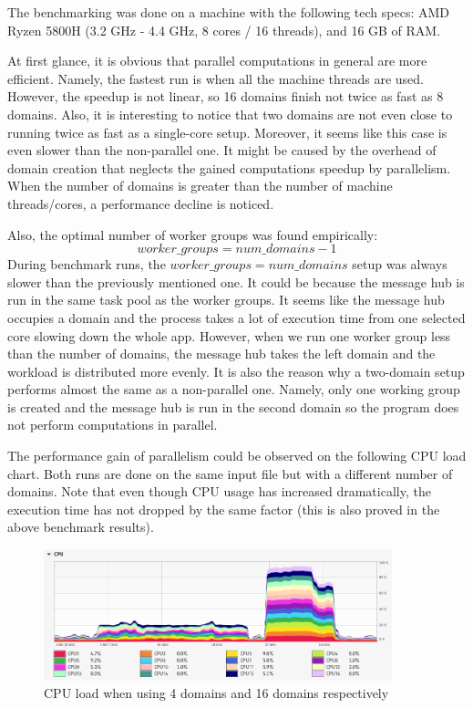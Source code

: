 \documentclass{article}
\begin{document}
The benchmarking was done on a machine with the following tech specs: AMD Ryzen 5800H (3.2 GHz - 4.4 GHz, 8 cores / 16 threads), and 16 GB of RAM. 

At first glance, it is obvious that parallel computations in general are more efficient. Namely, the fastest run is when all the machine threads are used. However, the speedup is not linear, so 16 domains finish not twice as fast as 8 domains. Also, it is interesting to notice that two domains are not even close to running twice as fast as a single-core setup. Moreover, it seems like this case is even slower than the non-parallel one. It might be caused by the overhead of domain creation that neglects the gained computations speedup by parallelism. When the number of domains is greater than the number of machine threads/cores, a performance decline is noticed.

Also, the optimal number of worker groups was found empirically: 
$$ worker\_groups = num\_domains - 1 $$
During benchmark runs, the $ worker\_groups = num\_domains $ setup was always slower than the previously mentioned one. It could be because the message hub is run in the same task pool as the worker groups. It seems like the message hub occupies a domain and the process takes a lot of execution time from one selected core slowing down the whole app. However, when we run one worker group less than the number of domains, the message hub takes the left domain and the workload is distributed more evenly. It is also the reason why a two-domain setup performs almost the same as a non-parallel one. Namely, only one working group is created and the message hub is run in the second domain so the program does not perform computations in parallel.

The performance gain of parallelism could be observed on the following CPU load chart. Both runs are done on the same input file but with a different number of domains. Note that even though CPU usage has increased dramatically, the execution time has not dropped by the same factor (this is also proved in the above benchmark results).

\begin{figure}[h]
  \caption{CPU load when using 4 domains and 16 domains respectively}
  \vspace{0.2in}
  \centering
  \includegraphics[width=0.9\textwidth]{resources/cpu_load.png}
\end{figure}
\end{document}
